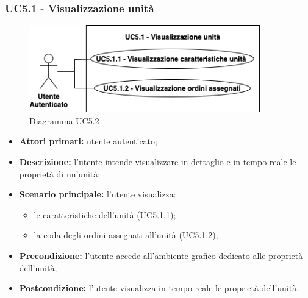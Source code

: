     \subsubsection{UC5.1 - Visualizzazione unità}
    \begin{figure}[h!]
        \centering
        \includegraphics[width=10cm]{images/uc5.1.png}
        \caption{Diagramma UC5.2}
    \end{figure}
    \begin{itemize}
        \item \textbf{Attori primari:} utente autenticato;
        \item \textbf{Descrizione:} l'utente intende visualizzare in dettaglio e in tempo reale le proprietà di un'unità;
        \item \textbf{Scenario principale:} l'utente visualizza:
        \begin{itemize}
            \item le caratteristiche dell'unità (UC5.1.1);
            \item la coda degli ordini assegnati all'unità (UC5.1.2);
        \end{itemize}
        \item \textbf{Precondizione:} l'utente accede all'ambiente grafico dedicato alle proprietà dell'unità;
        \item \textbf{Postcondizione:} l'utente visualizza in tempo reale le proprietà dell'unità.
    \end{itemize}

